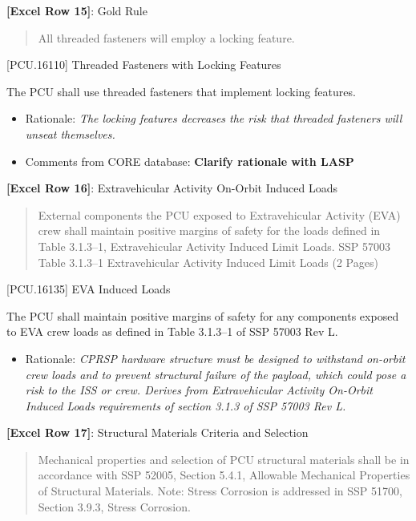 \textbf{[Excel Row 15]}: Gold Rule

\begin{quote}
All threaded fasteners will employ a locking feature.
\end{quote}

[PCU.16110] Threaded Fasteners with Locking Features

The PCU shall use threaded fasteners that implement locking features.

\begin{itemize}
\item{} Rationale: \emph{The locking features decreases the risk that threaded fasteners will unseat themselves.}

\item{} Comments from CORE database: \textbf{Clarify rationale with LASP}

\end{itemize}

\textbf{[Excel Row 16]}: Extravehicular Activity On-Orbit Induced Loads

\begin{quote}
External components the PCU exposed to Extravehicular Activity (EVA) crew shall maintain positive margins of safety for the loads defined in Table 3.1.3--1, Extravehicular Activity Induced Limit Loads.
SSP 57003 Table 3.1.3--1 Extravehicular Activity Induced Limit Loads (2 Pages)
\end{quote}

[PCU.16135] EVA Induced Loads

The PCU shall maintain positive margins of safety for any components exposed to EVA crew loads as defined in Table 3.1.3--1 of SSP 57003 Rev L.

\begin{itemize}
\item{} Rationale: \emph{CPRSP hardware structure must be designed to withstand on-orbit crew loads and to prevent structural failure of the payload, which could pose a risk to the ISS or crew. Derives from Extravehicular Activity On-Orbit Induced Loads requirements of section 3.1.3 of SSP 57003 Rev L.}

\end{itemize}

\textbf{[Excel Row 17]}: Structural Materials Criteria and Selection

\begin{quote}
Mechanical properties and selection of PCU structural materials shall be in accordance with SSP 52005, Section 5.4.1, Allowable Mechanical Properties of Structural Materials.
Note: Stress Corrosion is addressed in SSP 51700, Section 3.9.3, Stress Corrosion.
\end{quote}

